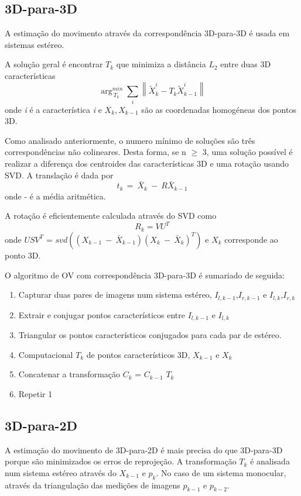 \subsection{3D-para-3D}

A estimação do movimento através da correspondência 3D-para-3D é usada em sistemas estéreo. 

A solução geral é encontrar \textit{$T_k$} que minimiza a distância \textit{$L_2$} entre duas 3D características \[ \arg_{\ T_k}^{min}\sum_{i}{\left \| \tilde{X}_k^i - T_k\tilde{X}_{k-1}^i \right \|} \] 
onde \textit{i} é a característica \textit{i} e \textit{$X_{k},X_{k-1}$} são as coordenadas homogéneas dos pontos 3D. 

Como analisado anteriormente, o numero mínimo de soluções são três correspondências não colineares. Desta forma, se n $\geq$ 3, uma solução possível é realizar a diferença dos centroides das características 3D e uma rotação usando SVD. A translação é dada por \[ t_{k\ }=\ {\bar{X}}_k\ -\ R{\bar{X}}_{k-1} \] onde - é a média aritmética.

A rotação é eficientemente calculada através do SVD como \[ R_k = VU^T \] onde $USV^T$ = $svd({(X_{k-1}\ -\ {\bar{X}}_{k-1})(X_k\ -\ {\bar{X}}_k)}^T)$ e \textit{$X_k$} corresponde ao ponto 3D.

O algoritmo de OV com correspondência 3D-para-3D é sumariado de seguida:
\begin{enumerate}
	\item Capturar duas pares de imagens num sistema estéreo, \textit{$I_{l,k-1}$},\textit{$I_{r,k-1}$} e \textit{$I_{l,k}$},\textit{$I_{r,k}$}
	\item Extrair e conjugar pontos característicos entre \textit{$I_{l,k-1}$} e \textit{$I_{l,k}$}
	\item Triangular os pontos característicos conjugados para cada par de estéreo.
	\item Computacional \textit{$T_k$} de pontos característicos 3D, \textit{$X_{k-1}$} e \textit{$X_k$}  
	\item Concatenar a transformação $C_k$ = $ C_{k-1}$ $T_k$
	\item Repetir 1
\end{enumerate}
 


\subsection{3D-para-2D}

A estimação do movimento de 3D-para-2D é mais precisa do que 3D-para-3D porque são minimizados os erros de reprojeção. A transformação \textit{$T_k$} é analisada num sistema estéreo através do \textit{$X_{k-1}$} e \textit{$p_k$}. No caso de um sistema monocular, através da triangulação das medições de imagens \textit{$p_{k-1}$} e \textit{$p_{k-2}$}. 

